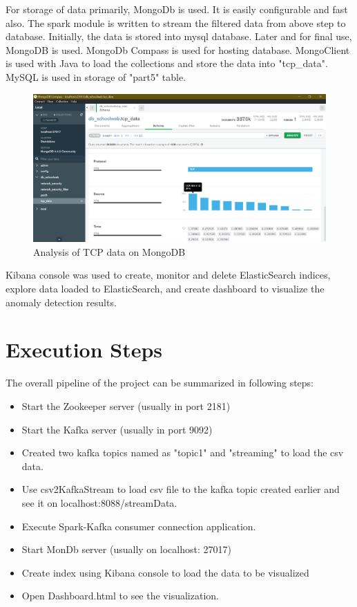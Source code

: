 \documentclass{article}
\begin{document}
For storage of data primarily, MongoDb is used. It is easily configurable and fast also. The spark module is written to stream the filtered data from above step to database. Initially, the data is stored into mysql database. Later and for final use, MongoDB is used. MongoDb Compass is used for hosting database. MongoClient is used with Java to load the collections and store the data into "tcp\_data". MySQL is used in storage of "part5" table.
\begin{figure}[h!]
\centering
\includegraphics[scale=0.35]{tcp_analysis_mongoDb.png}
\caption{Analysis of TCP data on MongoDB}
\label{fig:universe}
\end{figure}


Kibana console was used to create, monitor and delete ElasticSearch indices, explore data loaded to ElasticSearch, and create dashboard to visualize the anomaly detection results.

\section{Execution Steps}
The overall pipeline of the project can be summarized in following steps:
\begin{itemize}
    \item Start the Zookeeper server (usually in port 2181)
    \item Start the Kafka server (usually in port 9092)
    \item Created two kafka topics named as "topic1" and "streaming" to load the csv data.
    \item Use csv2KafkaStream to load csv file to the kafka topic created earlier and see it on localhost:8088/streamData.
    \item Execute Spark-Kafka consumer connection application.
    \item Start MonDb server (usually on localhost: 27017)
    \item Create index using Kibana console to load the data to be visualized
    \item Open Dashboard.html to see the visualization.
\end{itemize}
\end{document}
